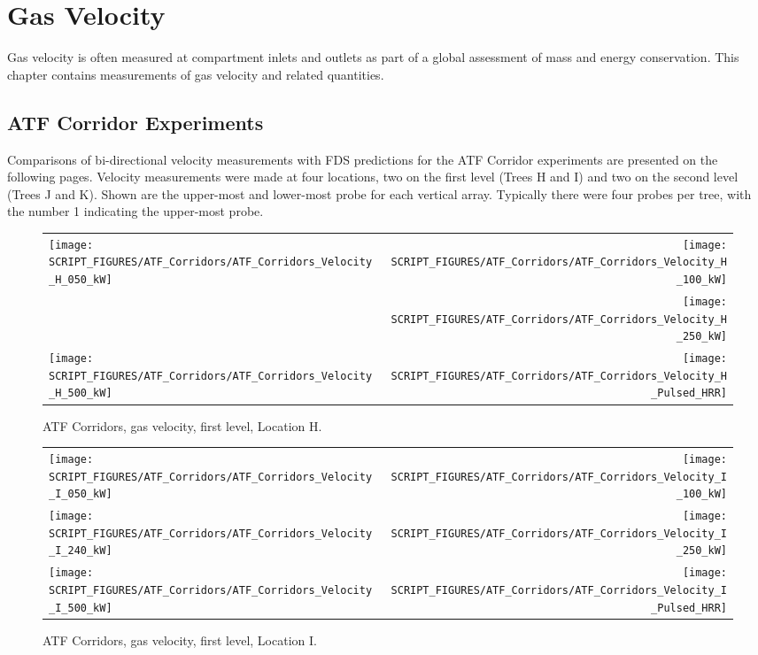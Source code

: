 
\chapter{Gas Velocity}

Gas velocity is often measured at compartment inlets and outlets as part of a global assessment of mass and
energy conservation.  This chapter contains measurements of gas velocity and related quantities.

\section{ATF Corridor Experiments}

Comparisons of bi-directional velocity measurements with FDS predictions for the ATF Corridor experiments are presented on the following
pages. Velocity measurements were made at four locations, two on the first level (Trees H and I) and two on the second level (Trees J and K).
Shown are the upper-most and lower-most probe for each vertical array. Typically there were four probes per tree, with the number 1 indicating the
upper-most probe.

\newpage

\begin{figure}[p]
\begin{tabular*}{\textwidth}{l@{\extracolsep{\fill}}r}
\texttt{[image: SCRIPT\_FIGURES/ATF\_Corridors/ATF\_Corridors\_Velocity\_H\_050\_kW]} &
\texttt{[image: SCRIPT\_FIGURES/ATF\_Corridors/ATF\_Corridors\_Velocity\_H\_100\_kW]} \\
 &
\texttt{[image: SCRIPT\_FIGURES/ATF\_Corridors/ATF\_Corridors\_Velocity\_H\_250\_kW]} \\
\texttt{[image: SCRIPT\_FIGURES/ATF\_Corridors/ATF\_Corridors\_Velocity\_H\_500\_kW]} &
\texttt{[image: SCRIPT\_FIGURES/ATF\_Corridors/ATF\_Corridors\_Velocity\_H\_Pulsed\_HRR]}
\end{tabular*}
\caption{ATF Corridors, gas velocity, first level, Location H.}
\label{ATF_Velocity_H}
\end{figure}

\begin{figure}[p]
\begin{tabular*}{\textwidth}{l@{\extracolsep{\fill}}r}
\texttt{[image: SCRIPT\_FIGURES/ATF\_Corridors/ATF\_Corridors\_Velocity\_I\_050\_kW]} &
\texttt{[image: SCRIPT\_FIGURES/ATF\_Corridors/ATF\_Corridors\_Velocity\_I\_100\_kW]} \\
\texttt{[image: SCRIPT\_FIGURES/ATF\_Corridors/ATF\_Corridors\_Velocity\_I\_240\_kW]} &
\texttt{[image: SCRIPT\_FIGURES/ATF\_Corridors/ATF\_Corridors\_Velocity\_I\_250\_kW]} \\
\texttt{[image: SCRIPT\_FIGURES/ATF\_Corridors/ATF\_Corridors\_Velocity\_I\_500\_kW]} &
\texttt{[image: SCRIPT\_FIGURES/ATF\_Corridors/ATF\_Corridors\_Velocity\_I\_Pulsed\_HRR]}
\end{tabular*}
\caption{ATF Corridors, gas velocity, first level, Location I.}
\label{ATF_Velocity_I}
\end{figure}


